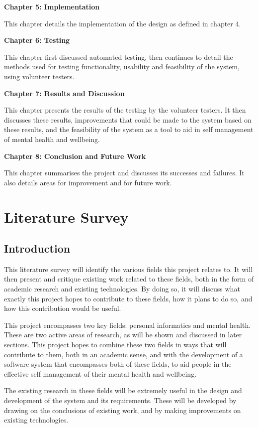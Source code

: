 \documentclass[11pt,openright,a4paper]{report}
\begin{document}
\textbf{Chapter 5: Implementation}

This chapter details the implementation of the design as defined in chapter 4.

\textbf{Chapter 6: Testing}

This chapter first discussed automated testing, then continues to detail the methods used for testing functionality, usability and feasibility of the system, using volunteer testers.

\textbf{Chapter 7: Results and Discussion}

This chapter presents the results of the testing by the volunteer testers. It then discusses these results, improvements that could be made to the system based on these results, and the feasibility of the system as a tool to aid in self management of mental health and wellbeing.

\textbf{Chapter 8: Conclusion and Future Work}

This chapter summarises the project and discusses its successes and failures. It also details areas for improvement and for future work.


\chapter{Literature Survey} \label{litsurvey}
\section{Introduction} \label{introduction}
This literature survey will identify the various fields this project relates to. It will then present and critique existing work related to these fields, both in the form of academic research and existing technologies. By doing so, it will discuss what exactly this project hopes to contribute to these fields, how it plans to do so, and how this contribution would be useful.

This project encompasses two key fields: personal informatics and mental health. These are two active areas of research, as will be shown and discussed in later sections. This project hopes to combine these two fields in ways that will contribute to them, both in an academic sense, and with the development of a software system that encompasses both of these fields, to aid people in the effective self management of their mental health and wellbeing.

The existing research in these fields will be extremely useful in the design and development of the system and its requirements. These will be developed by drawing on the conclusions of existing work, and by making improvements on existing technologies.
\end{document}
